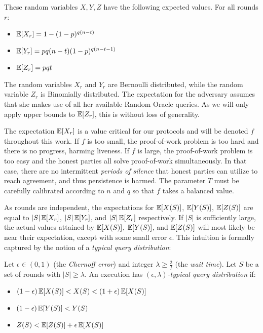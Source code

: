 These random variables $X, Y, Z$ have the following expected values. For all
rounds $r$:

\begin{itemize}
  \item $\operatorname{\mathbb{E}}[X_r] = 1 - (1 - p)^{q(n - t)}$
  \item $\operatorname{\mathbb{E}}[Y_r] = pq(n - t)(1 - p)^{q(n - t - 1)}$
  \item $\operatorname{\mathbb{E}}[Z_r] = pqt$
\end{itemize}

The random variables $X_r$ and $Y_r$ are Bernoulli distributed, while the
random variable $Z_r$ is Binomially distributed.
The expectation for the adversary assumes that she makes use of all
her available Random Oracle queries. As we will only apply upper bounds to
$\operatorname{\mathbb{E}}[Z_r]$, this is without loss of generality.

The expectation $\operatorname{\mathbb{E}}[X_r]$ is a value critical for our protocols and will be
denoted $f$ throughout this work. If $f$ is too small, the
proof-of-work problem is too hard and there is no progress, harming liveness.
If $f$ is large, the proof-of-work problem is too easy and the honest parties
all solve proof-of-work simultaneously. In that case, there are no intermittent
\emph{periods of silence} that honest parties can
utilize to reach agreement, and thus persistence is harmed. The parameter $T$
must be carefully calibrated according to $n$ and $q$ so that $f$ takes a
balanced value.

As rounds are independent, the expectations for $\operatorname{\mathbb{E}}[X(S)]$, $\operatorname{\mathbb{E}}[Y(S)]$,
$\operatorname{\mathbb{E}}[Z(S)]$ are equal to $|S|\operatorname{\mathbb{E}}[X_r]$, $|S|\operatorname{\mathbb{E}}[Y_r]$, and $|S|\operatorname{\mathbb{E}}[Z_r]$
respectively. If $|S|$ is sufficiently large, the actual values attained by
$\operatorname{\mathbb{E}}[X(S)]$, $\operatorname{\mathbb{E}}[Y(S)]$, and $\operatorname{\mathbb{E}}[Z(S)]$ will most likely be near their
expectation, except with some small error $\epsilon$. This intuition is formally
captured by the notion of a \emph{typical query distribution}:

\begin{definition}
  Let $\epsilon \in (0, 1)$ (the \emph{Chernoff error}) and integer $\lambda
  \geq \frac{2}{f}$ (the \emph{wait time}). Let $S$ be a set of rounds with $|S|
  \geq \lambda$. An execution has \emph{$(\epsilon, \lambda)$-typical query
  distribution} if:

  \begin{itemize}
    \item $(1 - \epsilon)\operatorname{\mathbb{E}}[X(S)] < X(S) < (1 + \epsilon)\operatorname{\mathbb{E}}[X(S)]$
    \item $(1 - \epsilon)\operatorname{\mathbb{E}}[Y(S)] < Y(S)$
    \item $Z(S) < \operatorname{\mathbb{E}}[Z(S)] + \epsilon\operatorname{\mathbb{E}}[X(S)]$
  \end{itemize}
\end{definition}

